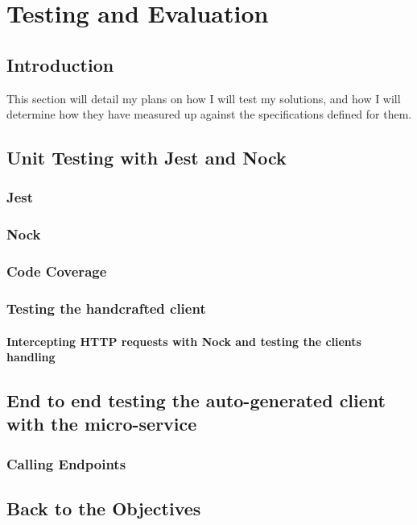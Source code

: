 \chapter{Testing and Evaluation}
\section{Introduction}
This section will detail my plans on how I will test my solutions, and how I will determine how they have measured up against the specifications defined for them.
\section{Unit Testing with Jest and Nock}
\subsection{Jest}
\subsection{Nock}
\subsection{Code Coverage}
\subsection{Testing the handcrafted client}
\subsubsection{Intercepting HTTP requests with Nock and testing the clients handling}
\section{End to end testing the auto-generated client with the micro-service}
\subsection{Calling Endpoints}
\section{Back to the Objectives}

